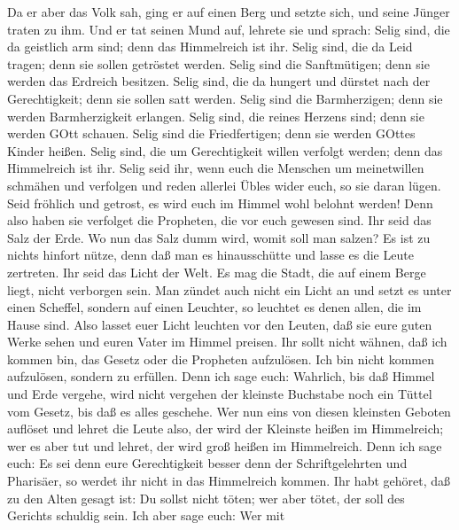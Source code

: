  Da er aber das Volk sah, ging er auf einen Berg und setzte
sich, und seine Jünger traten zu ihm.  Und er tat seinen
Mund auf, lehrete sie und sprach:  Selig sind, die da
geistlich arm sind; denn das Himmelreich ist ihr.  Selig
sind, die da Leid tragen; denn sie sollen getröstet werden. 
Selig sind die Sanftmütigen; denn sie werden das Erdreich besitzen.
 Selig sind, die da hungert und dürstet nach der
Gerechtigkeit; denn sie sollen satt werden.  Selig sind die
Barmherzigen; denn sie werden Barmherzigkeit erlangen. 
Selig sind, die reines Herzens sind; denn sie werden GOtt schauen.
 Selig sind die Friedfertigen; denn sie werden GOttes Kinder
heißen.  Selig sind, die um Gerechtigkeit willen verfolgt
werden; denn das Himmelreich ist ihr.  Selig seid ihr, wenn
euch die Menschen um meinetwillen schmähen und verfolgen und reden
allerlei Übles wider euch, so sie daran lügen.  Seid
fröhlich und getrost, es wird euch im Himmel wohl belohnt werden! Denn
also haben sie verfolget die Propheten, die vor euch gewesen sind.
 Ihr seid das Salz der Erde. Wo nun das Salz dumm wird,
womit soll man salzen? Es ist zu nichts hinfort nütze, denn daß man es
hinausschütte und lasse es die Leute zertreten.  Ihr seid
das Licht der Welt. Es mag die Stadt, die auf einem Berge liegt, nicht
verborgen sein.  Man zündet auch nicht ein Licht an und
setzt es unter einen Scheffel, sondern auf einen Leuchter, so leuchtet
es denen allen, die im Hause sind.  Also lasset euer Licht
leuchten vor den Leuten, daß sie eure guten Werke sehen und euren Vater
im Himmel preisen.  Ihr sollt nicht wähnen, daß ich kommen
bin, das Gesetz oder die Propheten aufzulösen. Ich bin nicht kommen
aufzulösen, sondern zu erfüllen.  Denn ich sage euch:
Wahrlich, bis daß Himmel und Erde vergehe, wird nicht vergehen der
kleinste Buchstabe noch ein Tüttel vom Gesetz, bis daß es alles
geschehe.  Wer nun eins von diesen kleinsten Geboten
auflöset und lehret die Leute also, der wird der Kleinste heißen im
Himmelreich; wer es aber tut und lehret, der wird groß heißen im
Himmelreich.  Denn ich sage euch: Es sei denn eure
Gerechtigkeit besser denn der Schriftgelehrten und Pharisäer, so werdet
ihr nicht in das Himmelreich kommen.  Ihr habt gehöret, daß
zu den Alten gesagt ist: Du sollst nicht töten; wer aber tötet, der soll
des Gerichts schuldig sein.  Ich aber sage euch: Wer mit
